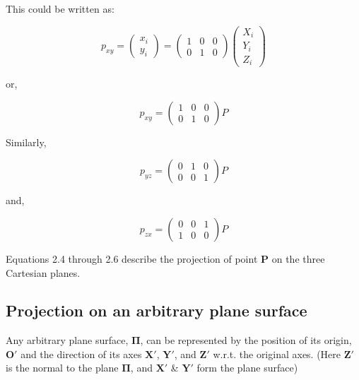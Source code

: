 \documentclass[a4paper,11pt,openany]{book}
\begin{document}
This could be written as:

\begin{equation}
p_{xy} = 
\left(\begin{array}{c} x_i \\ y_i \end{array}\right) =
\left(\begin{array}{ccc} 1 & 0 & 0 \\ 0 & 1 & 0 \end{array}\right) 
\left(\begin{array}{c} X_i \\ Y_i \\ Z_i\end{array}\right) 
\end{equation}

or,

\begin{equation}
p_{xy} = 
\left(\begin{array}{ccc} 1 & 0 & 0 \\ 0 & 1 & 0 \end{array}\right)P
\end{equation}

Similarly,

\begin{equation}
p_{yz} = 
\left(\begin{array}{ccc} 0 & 1 & 0 \\ 0 & 0 & 1 \end{array}\right)P
\end{equation}

and,

\begin{equation}
p_{zx} = 
\left(\begin{array}{ccc} 0 & 0 & 1 \\ 1 & 0 & 0 \end{array}\right)P
\end{equation}

Equations 2.4 through 2.6 describe the projection of point $\boldsymbol{P}$ on the three Cartesian planes.

\subsection{Projection on an arbitrary plane surface}
Any arbitrary plane surface,  $\boldsymbol{\Pi}$, can be represented by the position of its origin, $\boldsymbol{O'}$ and the direction of its axes $\boldsymbol{X'}$, $\boldsymbol{Y'}$, and $\boldsymbol{Z'}$ w.r.t. the original axes. (Here $\boldsymbol{Z'}$ is the normal to the plane  $\boldsymbol{\Pi}$, and  $\boldsymbol{X'}$ \&  $\boldsymbol{Y'}$ form the plane surface)\\
\end{document}

